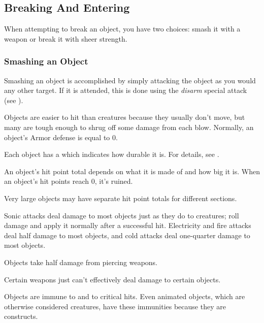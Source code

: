     \subsection{Breaking And Entering}
        When attempting to break an object, you have two choices: smash it with a weapon or break it with sheer strength.

        \subsubsection{Smashing an Object}
            Smashing an object is accomplished by simply attacking the object as you would any other target. If it is attended, this is done using the \textit{disarm} special attack (see ).

             Objects are easier to hit than creatures because they usually don't move, but many are tough enough to shrug off some damage from each blow.
            Normally, an object's Armor defense is equal to 0.

             Each object has a  which indicates how durable it is.
            For details, see .

             An object's hit point total depends on what it is made of and how big it is. When an object's hit points reach 0, it's ruined.

            Very large objects may have separate hit point totals for different sections.

             Sonic attacks deal damage to most objects just as they do to creatures; roll damage and apply it normally after a successful hit. Electricity and fire attacks deal half damage to most objects, and cold attacks deal one-quarter damage to most objects.

             Objects take half damage from piercing weapons.

             Certain weapons just can't effectively deal damage to certain objects.

             Objects are immune to  and to critical hits. Even animated objects, which are otherwise considered creatures, have these immunities because they are constructs.

